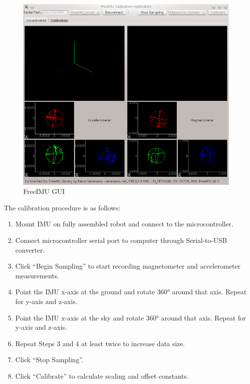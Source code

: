 \begin{figure}[H]   %
	\centering \includegraphics[width=6in, keepaspectratio]{figures/cal_gui.png}
	\caption{FreeIMU GUI \cite{freeimu}}\label{fig:cal_gui}
\end{figure}

The calibration procedure is as follows:
\begin{enumerate}
	\item \ssp Mount IMU on fully assembled robot and connect to the microcontroller.
	\item \ssp Connect microcontroller serial port to computer through Serial-to-USB converter.
	\item \ssp Click ``Begin Sampling'' to start recording magnetometer and accelerometer measurements.
	\item \ssp Point the IMU x-axis at the ground and rotate \ang{360} around that axis. Repeat for y-axis and z-axis.
	\item \ssp Point the IMU x-axis at the sky and rotate \ang{360} around that axis. Repeat for y-axis and z-axis.
	\item \ssp Repeat Steps 3 and 4 at least twice to increase data size.
	\item \ssp Click ``Stop Sampling''.
	\item \ssp Click ``Calibrate'' to calculate scaling and offset constants.
\end{enumerate}

